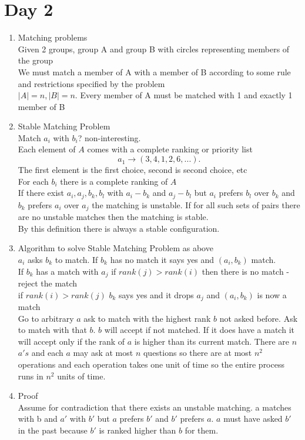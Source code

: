 \documentclass{amsart}
\begin{document}
\section{Day 2}
\begin{enumerate}
    \item Matching problems\\
        Given 2 groups, group A and group B with circles representing members of the group\\
        We must match a member of A with a member of B according to some rule and restrictions specified by the problem\\
        $|A| = n, |B|  = n$.
        Every member of A must be matched with 1 and exactly 1 member of B\\
    \item Stable Matching Problem\\
        Match $a_i$ with $b_i$? non-interesting.\\
        Each element of $A$ comes with a complete ranking or priority list
        \[
        a_1 \rightarrow (3, 4, 1, 2, 6, ... )
        .\] 
        The first element is the first choice, second is second choice, etc\\
        For each $b_i$ there is a complete ranking of $A$ \\
        If there exist $a_i,a_j,b_k,b_l$ with $a_i-b_k$ and $a_j-b_l$ but $a_i$ prefers $b_l$ over $b_k$ and  $b_k$ prefers $a_i$ over $a_j$ the matching
        is unstable. If for all such sets of pairs there are no unstable matches then the matching is stable.\\
        By this definition there is always a stable configuration.\\
    \item Algorithm to solve Stable Matching Problem as above\\
        $a_i$ asks $b_k$ to match. If $b_k$ has no match it says yes and $(a_i,b_k)$ match.\\
        If $b_k$ has a match with $a_j$ if  $rank(j) > rank(i)$ then there is no match - reject the match\\
        if  $rank(i) > rank(j)$ $b_k$ says yes and it drops $a_j$ and $(a_i, b_k)$ is now a match\\
        Go to arbitrary $a$ ask to match with the highest rank $b$ not asked before. Ask to match with that $b$.
        $b$ will accept if not matched. If it does have a match it will accept only if the rank of $a$ is higher than its current match.
        There are $n$ $a's$ and each $a$ may ask at most $n$ questions so there are at most $n^2$ operations and each operation takes one unit of time so  the entire process runs in $n^2$ units of time.\\
    \item Proof\\
        Assume for contradiction that there exists an unstable matching. a matches with b and $a'$ with $b'$ but $a$ prefers $b'$ and $b'$ prefers $a$.
        $a$ must have asked $b'$ in the past because $b'$ is ranked higher than $b$ for them.
\end{enumerate}
\end{document}

